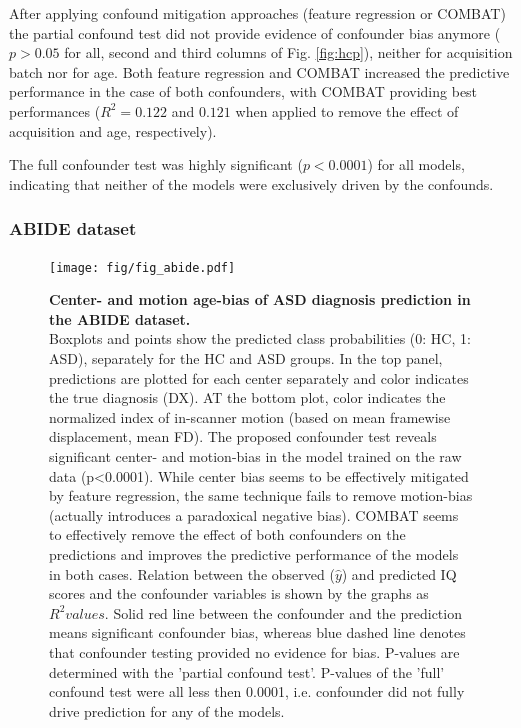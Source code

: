 \documentclass{article}
\begin{document}
After applying confound mitigation approaches (feature regression or COMBAT) the partial confound test did not provide evidence of confounder bias anymore ($p > 0.05$ for all, second and third columns of Fig. \ref{fig:hcp}), neither for acquisition batch nor for age. Both feature regression and COMBAT increased the predictive performance in the case of both confounders, with COMBAT providing best performances ($R^2=0.122$ and $0.121$ when applied to remove the effect of acquisition and age, respectively).

The full confounder test was highly significant ($p<0.0001$) for all models, indicating that neither of the models were exclusively driven by the confounds.

\subsubsection*{ABIDE dataset}

\begin{figure}[!b]
  \centering
  \texttt{[image: fig/fig\_abide.pdf]}
  \caption{\textbf{Center- and motion age-bias of ASD diagnosis prediction in the ABIDE dataset.} \\
  Boxplots and points show the predicted class probabilities (0: HC, 1: ASD), separately for the HC and ASD groups. In the top panel, predictions are plotted for each center separately and color indicates the true diagnosis (DX). AT the bottom plot, color indicates the normalized index of in-scanner motion (based on mean framewise displacement, mean FD). The proposed confounder test reveals significant center- and motion-bias in the model trained on the raw data (p<0.0001). While center bias seems to be effectively mitigated by feature regression, the same technique fails to remove motion-bias (actually introduces a paradoxical negative bias). COMBAT seems to effectively remove the effect of both confounders on the predictions and improves the predictive performance of the models in both cases.
  Relation between the observed ($\hat{y}$) and predicted IQ scores and the confounder variables is shown by the graphs as $R^2 values$. Solid red line between the confounder and the prediction means significant confounder bias, whereas blue dashed line denotes that confounder testing provided no evidence for bias. P-values are determined with the 'partial confound test'. P-values of the 'full' confound test were all less then 0.0001, i.e. confounder did not fully drive prediction for any of the models.
  }
  \label{fig:abide}
\end{figure}
\end{document}
